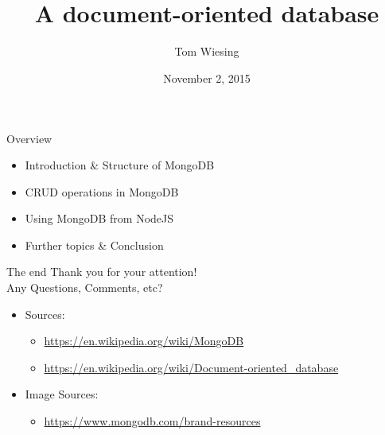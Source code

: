\documentclass{beamer}
\title{\logoimage{imgs/logo}{40px}\\A document-oriented database}
\author{Tom Wiesing}
\institute{Databases \& Web Applications}
\date{November 2, 2015}
\begin{document}
    \frame{\titlepage}

    \begin{frame}{Overview}
      \begin{itemize}
          \item Introduction \& Structure of MongoDB
          \item CRUD operations in MongoDB
          \item Using MongoDB from NodeJS
          \item Further topics \& Conclusion
      \end{itemize}
    \end{frame}

    

    

    

    

    \begin{frame}{The end}
      {\huge
        Thank you for your attention!\\
        Any Questions, Comments, etc?
      }

      \begin{itemize}
        \item Sources:
        \begin{itemize}
          \item \url{https://en.wikipedia.org/wiki/MongoDB}
          \item \url{https://en.wikipedia.org/wiki/Document-oriented_database}
        \end{itemize}
        \item Image Sources:
        \begin{itemize}
          \item \url{https://www.mongodb.com/brand-resources}
        \end{itemize}
      \end{itemize}
    \end{frame}
\end{document}
